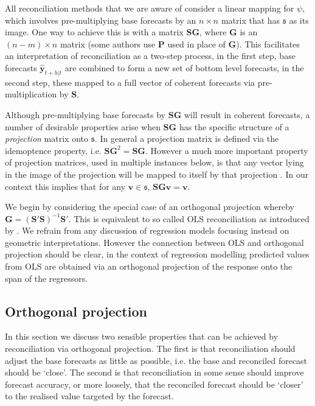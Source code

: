 \documentclass[12pt]{article}
\theoremstyle{definition}
\theoremstyle{property}
\begin{document}
	All reconciliation methods that we are aware of consider a linear mapping for $\psi$, which involves pre-multiplying base forecasts by an $n\times n$ matrix that has $\mathfrak{s}$ as its image.  One way to achieve this is with a matrix $\bm{SG}$, where $\bm{G}$ is an $(n-m)\times n$ matrix  (some authors use $\bm{P}$ used in place of $\bm{G}$).  This facilitates an interpretation of reconciliation as a two-step process, in the first step, base forecasts $\hat{\bm{y}}_{t+h|t}$ are combined to form a new set of bottom level forecasts, in the second step, these mapped to a full vector of coherent forecasts via pre-multiplication by $\bm{S}$.  
	
	Although pre-multiplying base forecasts by $\bm{SG}$ will result in coherent forecasts, a number of desirable properties arise when $\bm{SG}$ has the specific structure of a {\em projection} matrix onto $\mathfrak{s}$.  In general a projection matrix is defined via the idemoptence property, i.e. $\bm{SG}^2=\bm{SG}$.  However a much more important property of projection matrices, used in multiple instances below, is that any vector lying in the image of the projection will be mapped to itself by that projection \citep[see Lemma 2.4 in][for a proof]{rao1974}. In our context this implies that for any $\bm{v}\in\mathfrak{s}$, $\bm{SGv}=\bm{v}$.
	
	We begin by considering the special case of an orthogonal projection whereby $\bm{G}=\left(\bm{S}'\bm{S}\right)^{-1}\bm{S}'$.  This is equivalent to so called OLS reconciliation as introduced by \cite{Hyndman2011}.  We refrain from any discussion of regression models focusing instead on geometric interpretations.  However the connection between OLS and orthogonal projection should be clear, in the context of regression modelling predicted values from OLS are obtained via an orthogonal projection of the response onto the span of the regressors.
	
	\subsection{Orthogonal projection}
	
	In this section we discuss two sensible properties that can be achieved by reconciliation via orthogonal projection.  The  first is that reconciliation should adjust the base forecasts as little as possible, i.e. the base and reconciled forecast should be `close'.  The second is that reconciliation in some sense should improve forecast accuracy, or more loosely, that the reconciled forecast should be `closer' to the realised value targeted by the forecast.  
	
\end{document}
